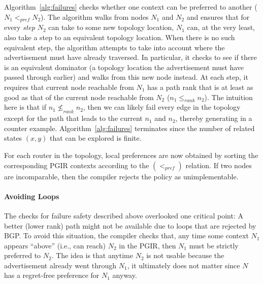 \documentclass[10pt]{sigalternate052015}
\newcommand{\para}[1]{\paragraph*{\textbf{#1}}}
\begin{document}
Algorithm~\ref{alg:failures} checks whether one context can be preferred to another ($N_1 <_{pref} N_2$). The algorithm walks from nodes $N_1$ and $N_2$ and ensures that for every \textit{step} $N_2$ can take to some new topology location, $N_1$ can, at the very least, also take a step to an equivalent topology location. When there is no such equivalent step, the algorithm attempts to take into account where the advertisement must have already traversed. In particular, it checks to see if there is an equivalent dominator (a topology location the advertisement must have passed through earlier) and walks from this new node instead. 
At each step, it requires that current node reachable from $N_1$ has a path rank that is at least as good as that of the current node reachable from $N_2$ ($n_1 \leq_{rank} n_2$). The intuition here is that if $n_1 \nleq_{rank} n_2$, then we can likely fail every edge in the topology except for the path that leads to the current $n_1$ and $n_2$, thereby generating in a counter example.
Algorithm~\ref{alg:failures} terminates since the number of related states $(x,y)$ that can be explored is finite.

For each router in the topology, local preferences are now obtained by sorting the corresponding PGIR contexts according to the $(<_{pref})$ relation. If two nodes are incomparable, then the compiler rejects the policy as unimplementable.

\para{Avoiding Loops}

The checks for failure safety described above overlooked one critical point: A better (lower rank) path might not be available due to loops that are rejected by BGP. To avoid this situation, the compiler checks that, any time some context $N_1$ appears ``above'' (i.e., can reach) $N_2$ in the PGIR, then $N_1$ must be strictly preferred to $N_2$. The idea is that anytime $N_2$ is not usable because the advertisement already went through $N_1$, it ultimately does not matter since $N$ has a regret-free preference for $N_1$ anyway.


\end{document}

